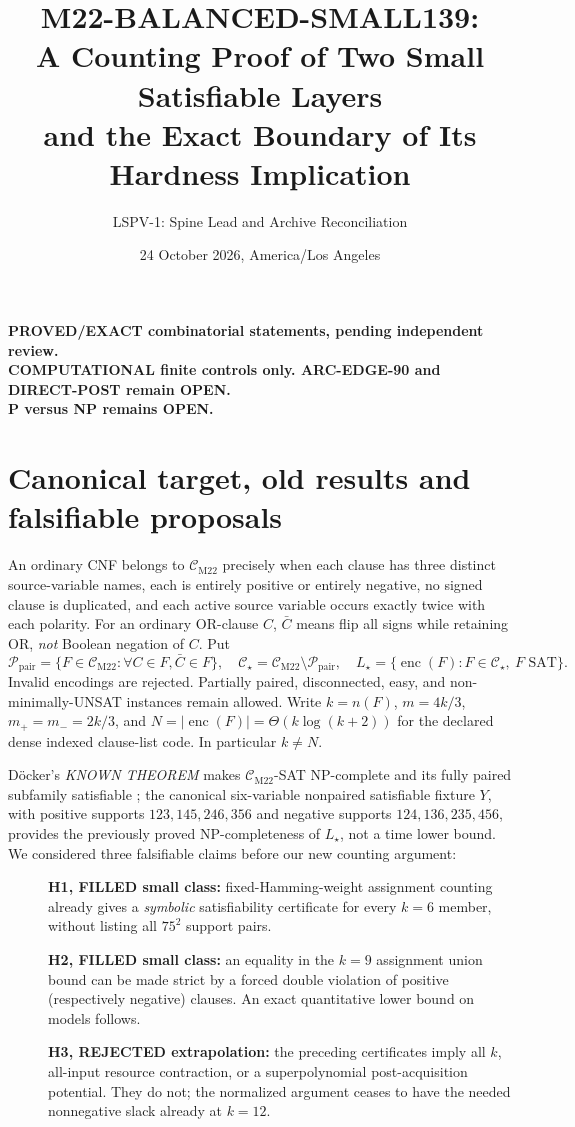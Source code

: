 \documentclass[11pt]{article}
\title{M22-BALANCED-SMALL139:\\A Counting Proof of Two Small Satisfiable Layers\\and the Exact Boundary of Its Hardness Implication}
\author{LSPV-1: Spine Lead and Archive Reconciliation}
\date{24 October 2026, America/Los Angeles}
\newcommand{\CM}{\mathcal C_{\mathrm{M22}}}
\newcommand{\CS}{\mathcal C_{\star}}
\begin{document}
\maketitle
\begin{center}
\textbf{PROVED/EXACT combinatorial statements, pending independent review.}\\
\textbf{COMPUTATIONAL finite controls only. ARC-EDGE-90 and DIRECT-POST remain OPEN.}\\
\textbf{P versus NP remains OPEN.}
\end{center}

\section{Canonical target, old results and falsifiable proposals}
An ordinary CNF belongs to \(\CM\) precisely when each clause has three distinct source-variable names, each is entirely positive or entirely negative, no signed clause is duplicated, and each active source variable occurs exactly twice with each polarity. For an ordinary OR-clause \(C\), \(\bar C\) means flip all signs while retaining OR, \emph{not} Boolean negation of \(C\). Put
\[
\mathcal P_{\mathrm{pair}}=\{F\in\CM:\forall C\in F,\bar C\in F\},
\quad\CS=\CM\setminus\mathcal P_{\mathrm{pair}},
\quad L_\star=\{\operatorname{enc}(F): F\in\CS,\ F\text{ SAT}\}.
\]
Invalid encodings are rejected. Partially paired, disconnected, easy, and non-minimally-UNSAT instances remain allowed. Write \(k=n(F)\), \(m=4k/3\), \(m_+=m_-=2k/3\), and \(N=|\operatorname{enc}(F)|=\Theta(k\log(k+2))\) for the declared dense indexed clause-list code. In particular \(k\ne N\).

D\"ocker's \emph{KNOWN THEOREM} makes \(\CM\)-SAT NP-complete and its fully paired subfamily satisfiable \cite{docker}; the canonical six-variable nonpaired satisfiable fixture \(Y\), with positive supports \(123,145,246,356\) and negative supports \(124,136,235,456\), provides the previously proved NP-completeness of \(L_\star\), not a time lower bound. We considered three falsifiable claims before our new counting argument:
\begin{description}
\item[] \textbf{H1, FILLED small class:} fixed-Hamming-weight assignment counting already gives a \emph{symbolic} satisfiability certificate for every \(k=6\) member, without listing all \(75^2\) support pairs.
\item[] \textbf{H2, FILLED small class:} an equality in the \(k=9\) assignment union bound can be made strict by a forced double violation of positive (respectively negative) clauses. An exact quantitative lower bound on models follows.
\item[] \textbf{H3, REJECTED extrapolation:} the preceding certificates imply all \(k\), all-input resource contraction, or a superpolynomial post-acquisition potential. They do not; the normalized argument ceases to have the needed nonnegative slack already at \(k=12\).
\end{description}
\end{document}
